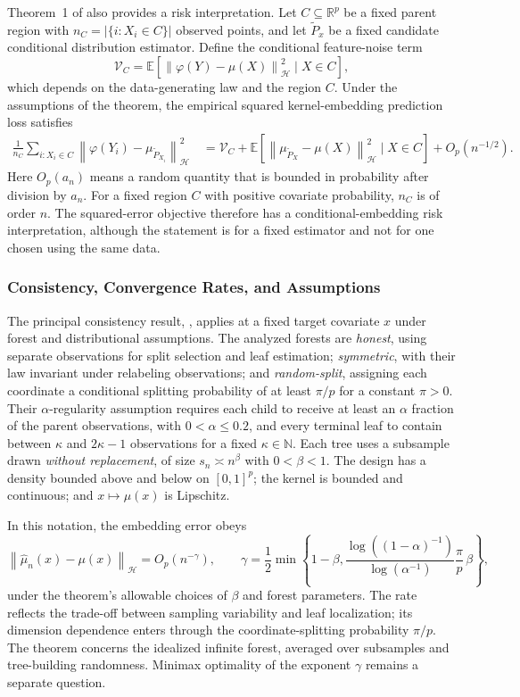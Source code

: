 \documentclass[12pt,a4paper]{article}
\newcommand{\E}{\mathbb E}
\newcommand{\R}{\mathbb R}
\newcommand{\calH}{\mathcal H}
\newcommand{\1}{\mathbf 1}
\newcommand{\norm}[1]{\left\lVert#1\right\rVert}
\begin{document}
Theorem~1 of \cite{cevid2022} also provides a risk interpretation. Let $C\subseteq\R^p$ be a fixed parent region with $n_C=|\{i:X_i\in C\}|$ observed points, and let $\widetilde P_x$ be a fixed candidate conditional distribution estimator. Define the conditional feature-noise term
\[
 \mathcal V_C=\E\!\left[\norm{\varphi(Y)-\mu(X)}_{\calH}^2\mid X\in C\right],
\]
which depends on the data-generating law and the region $C$. Under the assumptions of the theorem, the empirical squared kernel-embedding prediction loss satisfies
\begin{align}\label{eq:rkhsrisk}
 \frac{1}{n_C}\sum_{i:X_i\in C}
 \norm{\varphi(Y_i)-\mu_{\widetilde P_{X_i}}}_{\calH}^2
 \quad=\mathcal V_C+\E\!\left[\norm{\mu_{\widetilde P_X}-\mu(X)}_{\calH}^2\mid X\in C\right]
   +O_p(n^{-1/2}).
\end{align}
Here $O_p(a_n)$ means a random quantity that is bounded in probability after division by $a_n$. For a fixed region $C$ with positive covariate probability, $n_C$ is of order $n$. The squared-error objective therefore has a conditional-embedding risk interpretation, although the statement is for a fixed estimator and not for one chosen using the same data.

\subsubsection{Consistency, Convergence Rates, and Assumptions}\label{sec:consistency}
The principal consistency result, \cite[Theorem~2]{cevid2022}, applies at a fixed target covariate $x$ under forest and distributional assumptions. The analyzed forests are \emph{honest}, using separate observations for split selection and leaf estimation; \emph{symmetric}, with their law invariant under relabeling observations; and \emph{random-split}, assigning each coordinate a conditional splitting probability of at least $\pi/p$ for a constant $\pi>0$. Their $\alpha$-regularity assumption requires each child to receive at least an $\alpha$ fraction of the parent observations, with $0<\alpha\le0.2$, and every terminal leaf to contain between $\kappa$ and $2\kappa-1$ observations for a fixed $\kappa\in\mathbb N$. Each tree uses a subsample drawn \emph{without replacement}, of size $s_n\asymp n^\beta$ with $0<\beta<1$. The design has a density bounded above and below on $[0,1]^p$; the kernel is bounded and continuous; and $x\mapsto\mu(x)$ is Lipschitz.

In this notation, the embedding error obeys
\begin{equation}\label{eq:rate}
 \norm{\widehat\mu_n(x)-\mu(x)}_{\calH}=O_p(n^{-\gamma}),\qquad
 \gamma=\frac12\min\!\left\{1-\beta,
 \frac{\log((1-\alpha)^{-1})}{\log(\alpha^{-1})}\frac{\pi}{p}\,\beta\right\},
\end{equation}
under the theorem's allowable choices of $\beta$ and forest parameters. The rate reflects the trade-off between sampling variability and leaf localization; its dimension dependence enters through the coordinate-splitting probability $\pi/p$. The theorem concerns the idealized infinite forest, averaged over subsamples and tree-building randomness. Minimax optimality of the exponent $\gamma$ remains a separate question.
\end{document}
